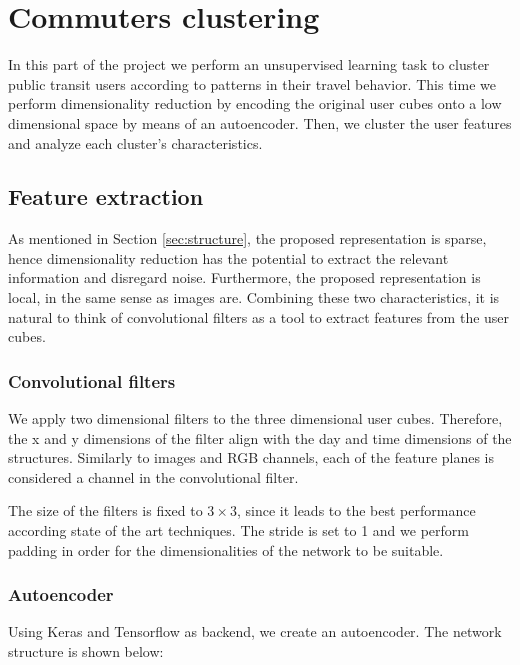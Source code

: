 \documentclass{article}
\begin{document}
\newpage
\section{Commuters clustering}
\label{sec:partIII}
In this part of the project we perform an unsupervised learning task to cluster public transit users according to patterns in their travel behavior. This time we perform dimensionality reduction by encoding the original user cubes onto a low dimensional space by means of an autoencoder. Then, we cluster the user features and analyze each cluster's characteristics. 

\subsection{Feature extraction}
As mentioned in Section \ref{sec:structure}, the proposed representation is sparse, hence dimensionality reduction has the potential to extract the relevant information and disregard noise. Furthermore, the proposed representation is local, in the same sense as images are. Combining these two characteristics, it is natural to think of convolutional filters as a tool to extract features from the user cubes. 

\subsubsection{Convolutional filters}
We apply two dimensional filters to the three dimensional user cubes. Therefore, the x and y dimensions of the filter align with the day and time dimensions of the structures. Similarly to images and RGB channels, each of the feature planes is considered a channel in the convolutional filter. 

The size of the filters is fixed to $3 \times 3$, since it leads to the best performance according state of the art techniques. The stride is set to 1 and we perform padding in order for the dimensionalities of the network to be suitable.

\subsubsection{Autoencoder}
Using Keras and Tensorflow as backend, we create an autoencoder. The network structure is shown below:
\end{document}
